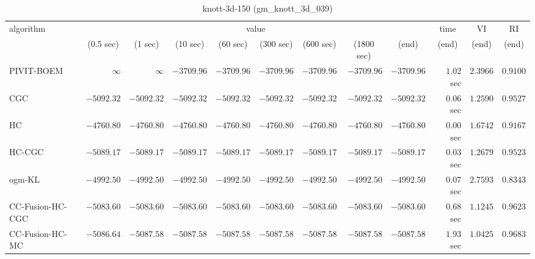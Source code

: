 \begin{table}[H]
\scriptsize
\centering
\caption{knott-3d-150 (gm\_knott\_3d\_039)}
\label{tab:anytimetable-knott-3d-150-gm-knott-3d-039}
\begin{tabular}{lrrrrrrrrrrr}
\toprule
           algorithm &                                   \multicolumn{8}{c}{value} & \multicolumn{1}{c}{time}    & \multicolumn{1}{c}{VI}  & \multicolumn{1}{c}{RI} \\  
\cmidrule(lr){2-9}\cmidrule(lr){10-10} \cmidrule(lr){11-11} \cmidrule(lr){12-12}   
                     & \multicolumn{1}{c}{(0.5 sec)} & \multicolumn{1}{c}{(1 sec)} & \multicolumn{1}{c}{(10 sec)} & \multicolumn{1}{c}{(60 sec)} & \multicolumn{1}{c}{(300 sec)} & \multicolumn{1}{c}{(600 sec)} & \multicolumn{1}{c}{(1800 sec)} & \multicolumn{1}{c}{(end)} & \multicolumn{1}{c}{(end)}    & \multicolumn{1}{c}{(end)}   & \multicolumn{1}{c}{(end)}  \\ \midrule 
          PIVIT-BOEM & $\infty$ & $\infty$ & $     -3709.96$ & $     -3709.96$ & $     -3709.96$ & $     -3709.96$ & $     -3709.96$ & $     -3709.96$ & $         1.02$ sec    & $       2.3966$  & $       0.9100$ \\ 
                 CGC & $     -5092.32$ & $     -5092.32$ & $     -5092.32$ & $     -5092.32$ & $     -5092.32$ & $     -5092.32$ & $     -5092.32$ & $     -5092.32$ & $         0.06$ sec    & $       1.2590$  & $       0.9527$ \\ 
                  HC & $     -4760.80$ & $     -4760.80$ & $     -4760.80$ & $     -4760.80$ & $     -4760.80$ & $     -4760.80$ & $     -4760.80$ & $     -4760.80$ & $         0.00$ sec    & $       1.6742$  & $       0.9167$ \\ 
              HC-CGC & $     -5089.17$ & $     -5089.17$ & $     -5089.17$ & $     -5089.17$ & $     -5089.17$ & $     -5089.17$ & $     -5089.17$ & $     -5089.17$ & $         0.03$ sec    & $       1.2679$  & $       0.9523$ \\ 
              ogm-KL & $     -4992.50$ & $     -4992.50$ & $     -4992.50$ & $     -4992.50$ & $     -4992.50$ & $     -4992.50$ & $     -4992.50$ & $     -4992.50$ & $         0.07$ sec    & $       2.7593$  & $       0.8343$ \\ 
    CC-Fusion-HC-CGC & $     -5083.60$ & $     -5083.60$ & $     -5083.60$ & $     -5083.60$ & $     -5083.60$ & $     -5083.60$ & $     -5083.60$ & $     -5083.60$ & $         0.68$ sec    & $       1.1245$  & $       0.9623$ \\ 
     CC-Fusion-HC-MC & $     -5086.64$ & $     -5087.58$ & $     -5087.58$ & $     -5087.58$ & $     -5087.58$ & $     -5087.58$ & $     -5087.58$ & $     -5087.58$ & $         1.93$ sec    & $       1.0425$  & $       0.9683$ \\ 

\end{tabular}
\end{table}
